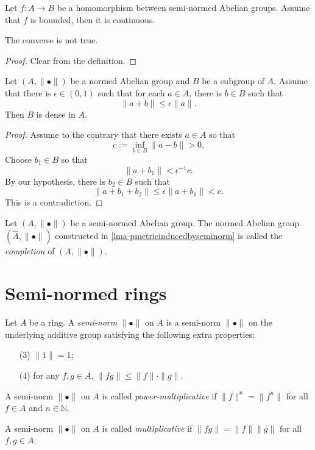 \begin{proposition}\label{prop-bddimplycont}
    Let $f:A\rightarrow B$ be a homomorphism between semi-normed Abelian groups. Assume that $f$ is bounded, then it is continuous.
\end{proposition}
The converse is not true.
\begin{proof}
    Clear from the definition.
\end{proof}

\begin{proposition}\label{prop-epsilondenseimpliesdense}
    Let $(A,\|\bullet\|)$ be a normed Abelian group and $B$ be a subgroup of $A$. Assume that there is $\epsilon\in (0,1)$ such that for each $a\in A$, there is $b\in B$ such that
    \[
      \|a+b\|\leq \epsilon \|a\|.  
    \]
    Then $B$ is dense in $A$.
\end{proposition}
\begin{proof}
    Assume to the contrary that there exists $a\in A$ so that
    \[
      c:=\inf_{b\in B}\|a-b\|>0.  
    \]
    Choose $b_1\in B$ so that
    \[
      \|a+b_1\|<\epsilon^{-1}c.
    \]
    By our hypothesis, there is $b_2\in B$ such that
    \[
      \|a+b_1+b_2\|\leq \epsilon\|a+b_1\|<c.  
    \]
    This is a contradiction.
\end{proof}

\begin{definition}\label{def-completionAbgroups}
    Let $(A,\|\bullet\|)$ be a semi-normed Abelian group. The normed Abelian group $(\hat{A},\|\bullet\|)$ constructed in \cref{lma-pmetricinducedbyseminorm} is called the \emph{completion} of $(A,\|\bullet\|)$.
\end{definition}



\section{Semi-normed rings}

\begin{definition}\label{def-seminormring}
    Let $A$ be a ring. A \emph{semi-norm} $\|\bullet\|$ on $A$ is a semi-norm $\|\bullet\|$ on the underlying additive group satisfying the following extra properties: 
    \begin{enumerate}
        \item[(3)]  $\|1\|=1$;
        \item[(4)] for any $f,g\in A$, $\|fg\|\leq \|f\|\cdot \|g\|$.
    \end{enumerate}
    
    A semi-norm $\|\bullet\|$ on $A$ is called \emph{power-multiplicative} if $\|f\|^n=\|f^n\|$ for all $f\in A$ and $n\in \mathbb{N}$.

    A semi-norm $\|\bullet\|$ on $A$ is called \emph{multiplicative} if $\|fg\|=\|f\|\|g\|$ for all $f,g\in A$.

\end{definition}

